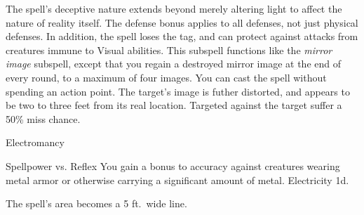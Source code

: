 The spell's deceptive nature extends beyond merely altering light to affect the nature of reality itself.
The defense bonus applies to all defenses, not just physical defenses.
In addition, the spell loses the  tag, and can protect against attacks from creatures immune to Visual abilities.
This subspell functions like the \textit{mirror image} subspell, except that you regain a destroyed mirror image at the end of every round, to a maximum of four images.
You can cast the spell without spending an action point.
The target's image is futher distorted, and appears to be two to three feet from its real location.
Targeted  against the target suffer a 50\% miss chance.
\begin{spellsection}{Electromancy}
\begin{spellheader}
\end{spellheader}
\begin{spellcontent}
\begin{spelltargetinginfo}
\end{spelltargetinginfo}
\begin{spelleffects}
\begin{spellattack}{Spellpower vs. Reflex}
\spellspecial You gain a  bonus to accuracy against creatures wearing metal armor or otherwise carrying a significant amount of metal.
\spellsuccess
Electricity  \minus1d.
\end{spellattack}
\end{spelleffects}
\end{spellcontent}
\begin{spellfooter}
\end{spellfooter}
\begin{spellsubcontent}
\begin{spellcantrip}
The spell's area becomes a 5 ft.\ wide \areamed line.
\end{spellcantrip}
\end{spellsubcontent}
\end{spellsection}
